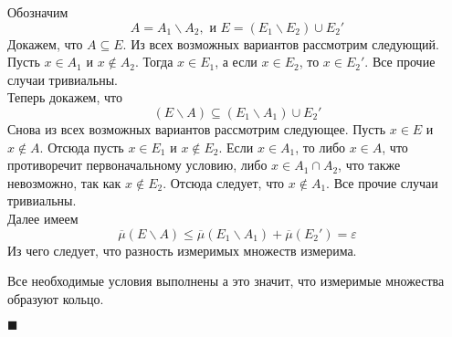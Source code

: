 \begin{enumerate}
Обозначим
\[A = A_1 \backslash A_2, \text{ и } E = (E_1\backslash E_2) \cup E_2'\]
Докажем, что $A\subseteq E$. Из всех возможных вариантов рассмотрим следующий. Пусть $x \in A_1$ и $x \not\in A_2$. Тогда $x \in E_1$, а если $x\in E_2$, то $x \in E_2'$. Все прочие случаи тривиальны. \\
Теперь докажем, что
\[(E\backslash A) \subseteq (E_1\backslash A_1) \cup E_2'\]
Снова из всех возможных вариантов рассмотрим следующее. Пусть $x \in E$ и $x \not\in A $. Отсюда пусть $x \in E_1$ и $x \not\in E_2$. Если $x \in A_1$, то либо $x \in A$, что противоречит первоначальному условию, либо $x \in A_1 \cap A_2$, что также невозможно, так как $x \not\in E_2$. Отсюда следует, что $x \not\in A_1$. Все прочие случаи тривиальны. \\
Далее имеем
\[\overline{\mu}(E\backslash A) \leq \overline{\mu}(E_1\backslash A_1) + \overline{\mu}(E_2') = \varepsilon\]
Из чего следует, что разность измеримых множеств измерима.
\end{enumerate}
Все необходимые условия выполнены а это значит, что измеримые множества образуют кольцо. 
\begin{flushright}
$\blacksquare$
\end{flushright}


